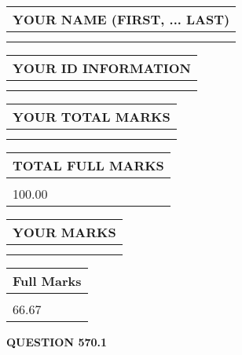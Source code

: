 \documentclass{ctexart}
\begin{document}
   
   
   
\newpage 
\setcounter{page}{ 
   570001 } 
   
   
   
   
\noindent\begin{tabular}{|l|}
\hline
YOUR NAME (FIRST, ... LAST)  \\
\hline
 \\ 
 \\ 
\hline
\end{tabular}
\hspace{0.05in} \begin{tabular}{|l|}
\hline
 YOUR   ID   INFORMATION  \\
\hline
 \\ 
 \\ 
\hline
\end{tabular}
   
   
\vspace{0.2in}\noindent\begin{tabular}{|l|}
\hline
YOUR TOTAL MARKS  \\
\hline
 \\ 
 \\ 
\hline
\end{tabular}
\hspace{0.05in} \begin{tabular}{|l|}
\hline
TOTAL FULL MARKS  \\
\hline
 \\ 
100.00 \\
\hline
\end{tabular}
   
   
 \vspace{0.2in}
 
 
 
 
   
   
  
\vspace{0.2in}
  
\noindent\begin{tabular}{|l|}
\hline
 YOUR MARKS  \\
\hline
 \\ 
 \\ 
\hline
\end{tabular}
\hspace{0.05in} \begin{tabular}{|l|}
\hline
 Full Marks  \\
\hline
 \\ 
66.67 \\
\hline
\end{tabular}
{\textbf{\Large{QUESTION
570.1 
}}}
  
\end{document}
